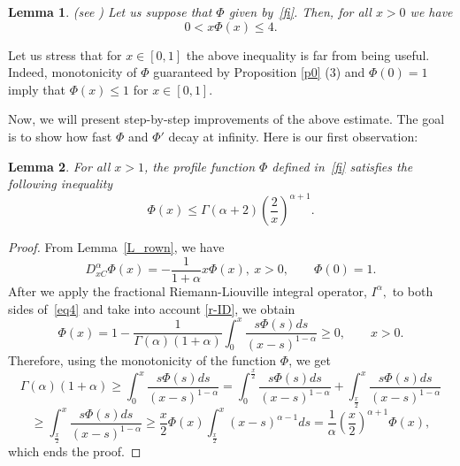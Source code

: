 \documentclass{article}
\newtheorem{lemma}{Lemma}
\begin{document}
\begin{lemma}\label{l-st}(see \cite[Lemma 8]{NRS})
    Let us suppose that $\Phi$ given by~\eqref{fi}. Then, for all $x>0$ we have
    $$0<x\Phi(x)\leq 4.$$
\end{lemma}
Let us stress that for $x\in[0,1]$ the above inequality is far from being useful. Indeed, %
monotonicity of $\Phi$ guaranteed by Proposition \ref{p0} (3) and $\Phi(0)=1$ imply that $\Phi(x)\le 1$ for $x\in[0,1]$. 

Now, we will present step-by-step improvements of the above estimate. The goal is to show how fast $\Phi$ and $\Phi'$ decay at infinity. 
Here is our first observation:
\begin{lemma}\label{L_oszacowanieFi}
  For all $x>1$, the profile function $\Phi$ defined in~\eqref{fi} satisfies the following inequality
\begin{equation}\label{oszacowanieFi}
\Phi(x)\leq\Gamma(\alpha+2)\left(\frac{2}{x}\right)^{\alpha+1}.
\end{equation}
\end{lemma}
\begin{proof}
    From Lemma~\ref{L_rown}, we have
\begin{equation}\label{eq4}
    D^\alpha_{xC}\Phi(x)=-\frac{1}{1+\alpha} x\Phi(x),\  x>0,\qquad  \Phi(0)=1.
\end{equation}
After we apply the fractional  Riemann-Liouville integral operator, $I^{\alpha},$ to both sides of~\eqref{eq4} and take into account \eqref{r-ID}, we obtain
$$\Phi(x)=1-\frac{1}{\Gamma(\alpha)(1+\alpha)}\int_0^x\frac{s\Phi(s)ds}{(x-s)^{1-\alpha}}\geq 0,\qquad x>0.$$
Therefore, using the monotonicity of the function $\Phi$, we get
$$\Gamma(\alpha)(1+\alpha)\geq\int_0^x\frac{s\Phi(s)ds}{(x-s)^{1-\alpha}}=\int_0^\frac{x}{2}\frac{s\Phi(s)ds}{(x-s)^{1-\alpha}}+\int_\frac{x}{2}^x\frac{s\Phi(s)ds}{(x-s)^{1-\alpha}}$$
$$\geq \int_\frac{x}{2}^x\frac{s\Phi(s)ds}{(x-s)^{1-\alpha}}\geq\frac{x}{2}\Phi(x)\int_\frac{x}{2}^x(x-s)^{\alpha-1}ds=\frac{1}{\alpha}\left(\frac{x}{2}\right)^{\alpha+1}\Phi(x),$$
which ends the proof.
\end{proof}
\end{document}

